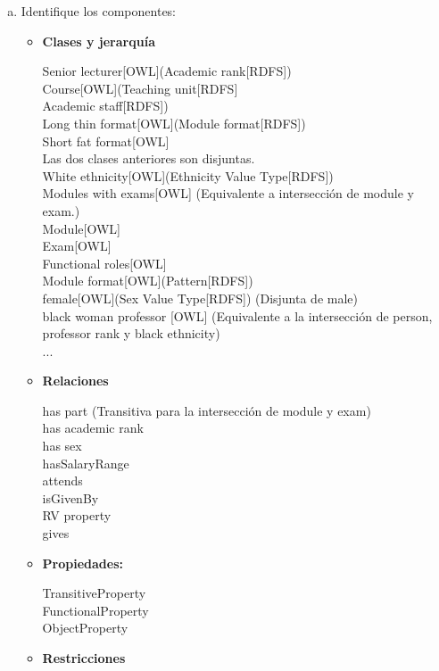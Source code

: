 \documentclass[a4paper,12pt,twoside,final,spanish]{article}
\begin{document}
\begin{enumerate}[a.]
\item Identifique los componentes:
	\begin{itemize}
	\item \textbf{Clases y jerarquía}
		
	Senior lecturer[OWL](Academic rank[RDFS]) \\
	Course[OWL](Teaching unit[RDFS] \\
	Academic staff[RDFS]) \\
	Long thin format[OWL](Module format[RDFS]) \\
	Short fat format[OWL] \\
	Las dos clases anteriores son disjuntas. \\
	White ethnicity[OWL](Ethnicity Value Type[RDFS]) \\
	Modules with exams[OWL] (Equivalente a intersección de module y exam.)\\
	Module[OWL] \\
	Exam[OWL] \\
	Functional roles[OWL] \\
	Module format[OWL](Pattern[RDFS]) \\
	female[OWL](Sex Value Type[RDFS]) (Disjunta de male)\\
	black woman professor [OWL] (Equivalente a la intersección de person, 					professor rank y black ethnicity) \\
	...
		
    \item \textbf{Relaciones }
    
    has part (Transitiva para la intersección de module y exam) \\
	has academic rank \\
	has sex\\
	hasSalaryRange\\
	attends\\
	isGivenBy\\
	RV property\\
	gives \\
    
	\item \textbf{Propiedades:}
	
	TransitiveProperty \\
	FunctionalProperty \\
	ObjectProperty \\
		
	\item \textbf{Restricciones}
	

\end{itemize}
\end{enumerate}
\end{document}
